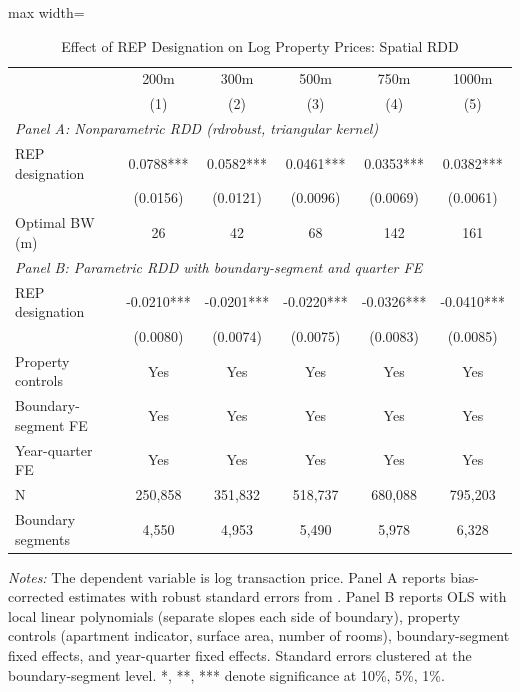 \begin{table}[htbp]
\centering
\caption{Effect of REP Designation on Log Property Prices: Spatial RDD}
\label{tab:main_rdd}
\begin{adjustbox}{max width=\textwidth}
\begin{tabular}{lccccc}
\toprule
 & 200m & 300m & 500m & 750m & 1000m \\
 & (1) & (2) & (3) & (4) & (5) \\
\midrule
\multicolumn{6}{l}{\textit{Panel A: Nonparametric RDD (rdrobust, triangular kernel)}} \\
REP designation & 0.0788*** & 0.0582*** & 0.0461*** & 0.0353*** & 0.0382*** \\
 & (0.0156) & (0.0121) & (0.0096) & (0.0069) & (0.0061) \\

Optimal BW (m) & 26 & 42 & 68 & 142 & 161 \\
\midrule
\multicolumn{6}{l}{\textit{Panel B: Parametric RDD with boundary-segment and quarter FE}} \\
REP designation & -0.0210*** & -0.0201*** & -0.0220*** & -0.0326*** & -0.0410*** \\
 & (0.0080) & (0.0074) & (0.0075) & (0.0083) & (0.0085) \\
\midrule
Property controls & Yes & Yes & Yes & Yes & Yes \\
Boundary-segment FE & Yes & Yes & Yes & Yes & Yes \\
Year-quarter FE & Yes & Yes & Yes & Yes & Yes \\
N & 250,858 & 351,832 & 518,737 & 680,088 & 795,203 \\
Boundary segments & 4,550 & 4,953 & 5,490 & 5,978 & 6,328 \\
\bottomrule
\end{tabular}
\end{adjustbox}
\begin{tablenotes}
\small
\item \textit{Notes:} The dependent variable is log transaction price. Panel A reports bias-corrected estimates with robust standard errors from \citet{cattaneo2020}. Panel B reports OLS with local linear polynomials (separate slopes each side of boundary), property controls (apartment indicator, surface area, number of rooms), boundary-segment fixed effects, and year-quarter fixed effects. Standard errors clustered at the boundary-segment level. *, **, *** denote significance at 10\%, 5\%, 1\%.
\end{tablenotes}
\end{table}
